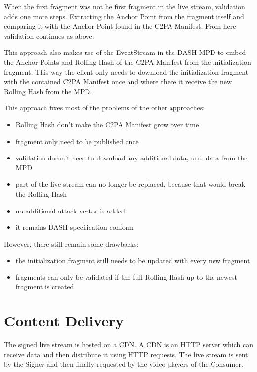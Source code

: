When the first fragment was not he first fragment in the live stream, validation adds one more steps. Extracting the Anchor Point from the fragment itself and comparing it with the Anchor Point found in the C2PA Manifest. From here validation continues as above.

This approach also makes use of the EventStream in the DASH MPD  to embed the Anchor Points and Rolling Hash of the C2PA Manifest from the initialization fragment. This way the client only needs to download the initialization fragment with the contained C2PA Manifest once and where there it receive the new Rolling Hash from the MPD.

This approach fixes most of the problems of the other approaches:

\begin{itemize}
    \item Rolling Hash don't make the C2PA Manifest grow over time
    \item fragment only need to be published once
    \item validation doesn't need to download any additional data, uses data from the MPD
    \item part of the live stream can no longer be replaced, because that would break the Rolling Hash
    \item no additional attack vector is added
    \item it remains DASH specification conform 
\end{itemize}

However, there still remain some drawbacks:

\begin{itemize}
    \item the initialization fragment still needs to be updated with every new fragment
    \item fragments can only be validated if the full Rolling Hash up to the newest fragment is created
\end{itemize}

\section{Content Delivery\label{sec:cdn}}

The signed live stream is hosted on a CDN. A CDN is an HTTP server which can receive data and then distribute it using HTTP requests. The live stream is sent by the Signer and then finally requested by the video players of the Consumer.

